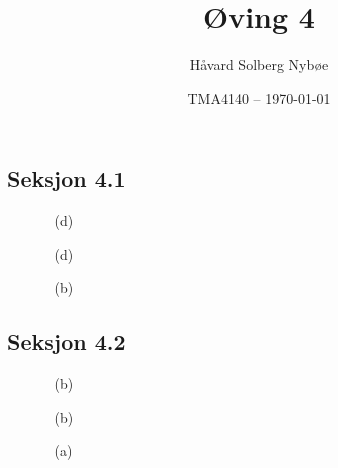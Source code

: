 \documentclass[a4paper, 12pt]{article}  %
\title{Øving 4}               %
\author{Håvard Solberg Nybøe}           %
\date{TMA4140 -- \today}                    %
\begin{document}
\maketitle

\subsection*{Seksjon 4.1}
\begin{enumerate}
    \item [\boxed{6}]
    \item [\boxed{17}]
          \begin{enumerate}
              \item [(d)]
          \end{enumerate}
    \item [\boxed{18}]
          \begin{enumerate}
              \item [(d)]
          \end{enumerate}
    \item [\boxed{39}]
          \begin{enumerate}
              \item [(b)]
          \end{enumerate}
    \item [\boxed{44}]
\end{enumerate}

\subsection*{Seksjon 4.2}
\begin{enumerate}
    \item [\boxed{3}]
          \begin{enumerate}
              \item [(b)]
          \end{enumerate}
    \item [\boxed{7}]
          \begin{enumerate}
              \item [(b)]
          \end{enumerate}
    \item [\boxed{24}]
          \begin{enumerate}
              \item [(a)]
          \end{enumerate}
\end{enumerate}
\end{document}
